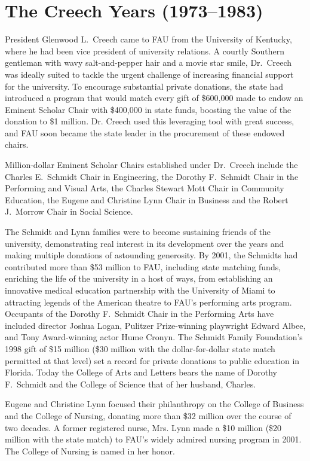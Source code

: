 \documentclass[phd, 12pt, print]{fauthesis}
\begin{document}
\section{The Creech Years (1973--1983)}

President Glenwood L.\ Creech came to FAU from the University of Kentucky, where he had been vice president of university relations.  A courtly Southern gentleman with wavy salt-and-pepper hair and a movie star smile, Dr.\ Creech was ideally suited to tackle the urgent challenge of increasing financial support for the university.  To encourage substantial private donations, the state had introduced a program that would match every gift of \$600,000 made to endow an Eminent Scholar Chair with \$400,000 in state funds, boosting the value of the donation to \$1 million.  Dr. Creech used this leveraging tool with great success, and FAU soon became the state leader in the procurement of these endowed chairs.

Million-dollar Eminent Scholar Chairs established under Dr.\ Creech include the Charles E.\ Schmidt Chair in Engineering, the Dorothy F.\ Schmidt Chair in the Performing and Visual Arts, the Charles Stewart Mott Chair in Community Education, the Eugene and Christine Lynn Chair in Business and the Robert J.\ Morrow Chair in Social Science.

The Schmidt and Lynn families were to become sustaining friends of the university, demonstrating real interest in its development over the years and making multiple donations of astounding generosity.  By 2001, the Schmidts had contributed more than \$53 million to FAU, including state matching funds, enriching the life of the university in a host of ways, from establishing an innovative medical education partnership with the University of Miami to attracting legends of the American theatre to FAU's performing arts program.  Occupants of the Dorothy F.\ Schmidt Chair in the Performing Arts have included director Joshua Logan, Pulitzer Prize-winning playwright Edward Albee, and Tony Award-winning actor Hume Cronyn.  The Schmidt Family Foundation's 1998 gift of \$15 million (\$30 million with the dollar-for-dollar state match permitted at that level) set a record for private donations to public education in Florida.  Today the College of Arts and Letters bears the name of Dorothy F.\ Schmidt and the College of Science that of her husband, Charles.

Eugene and Christine Lynn focused their philanthropy on the College of Business and the College of Nursing, donating more than \$32 million over the course of two decades.  A former registered nurse, Mrs. Lynn made a \$10 million (\$20 million with the state match) to FAU's widely admired nursing program in 2001.  The College of Nursing is named in her honor.
\end{document}
